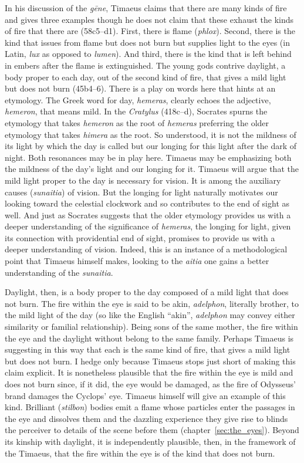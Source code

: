 In his discussion of the \emph{gēne}, Timaeus claims that there are many kinds of fire and gives three examples though he does not claim that these exhaust the kinds of fire that there are (58c5–d1). First, there is flame (\emph{phlox}). Second, there is the kind that issues from flame but does not burn but supplies light to the eyes (in Latin, \emph{lux} as opposed to \emph{lumen}). And third, there is the kind that is left behind in embers after the flame is extinguished. The young gods contrive daylight, a body proper to each day, out of the second kind of fire, that gives a mild light but does not burn (45b4--6). There is a play on words here that hints at an etymology. The Greek word for day, \emph{hemeras}, clearly echoes the adjective, \emph{hemeron}, that means mild. In the \emph{Cratylus} (418c--d), Socrates spurns the etymology that takes \emph{hemeron} as the root of \emph{hemeras} preferring the older etymology that takes \emph{himera} as the root. So understood, it is not the mildness of its light by which the day is called but our longing for this light after the dark of night. Both resonances may be in play here. Timaeus may be emphasizing both the mildness of the day's light and our longing for it. Timaeus will argue that the mild light proper to the day is necessary for vision. It is among the auxiliary causes (\emph{sunaitia}) of vision. But the longing for light naturally motivates our looking toward the celestial clockwork and so contributes to the end of sight as well. And just as Socrates suggests that the older etymology provides us with a deeper understanding of the significance of \emph{hemeras}, the longing for light, given its connection with providential end of sight, promises to provide us with a deeper understanding of vision. Indeed, this is an instance of a methodological point that Timaeus himself makes, looking to the \emph{aitia} one gains a better understanding of the \emph{sunaitia}.

Daylight, then, is a body proper to the day composed of a mild light that does not burn. The fire within the eye is said to be akin, \emph{adelphon}, literally brother, to the mild light of the day (so like the English ``akin'', \emph{adelphon} may convey either similarity or familial relationship). Being sons of the same mother, the fire within the eye and the daylight without belong to the same family. Perhaps Timaeus is suggesting in this way that each is the same kind of fire, that gives a mild light but does not burn. I hedge only because Timaeus stops just short of making this claim explicit. It is nonetheless plausible that the fire within the eye is mild and does not burn since, if it did, the eye would be damaged, as the fire of Odysseus' brand damages the Cyclops' eye. Timaeus himself will give an example of this kind. Brilliant (\emph{stilbon}) bodies emit a flame whose particles enter the passages in the eye and dissolves them and the dazzling experience they give rise to blinds the perceiver to details of the scene before them (chapter~\ref{sec:the_eyes}). Beyond its kinship with daylight, it is independently plausible, then, in the framework of the Timaeus, that the fire within the eye is of the kind that does not burn.

